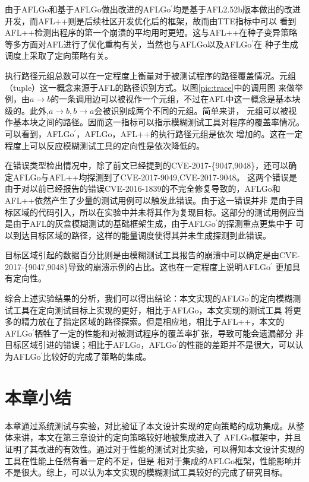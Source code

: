 \documentclass[bachelor]{njupthesis}
\begin{document}
由于AFLGo和基于AFLGo做出改进的AFLGo$^\prime$均是基于AFL2.52b版本做出的改进开发，而AFL++则是后续社区开发优化后的框架，故而由TTE指标中可以
看到AFL++检测出程序的第一个崩溃的平均用时更短。这与AFL++在种子变异策略等多方面对AFL进行了优化重构有关，当然也与AFLGo以及AFLGo$^\prime$在
种子生成调度上采取了定向策略有关。

执行路径元组总数可以在一定程度上衡量对于被测试程序的路径覆盖情况。元组（tuple）这一概念来源于AFL的路径识别方式。以图\ref{pic:trace}中的调用图
来做举例，由$a\to b$的一条调用边可以被视作一个元组，不过在AFL中这一概念是基本块级的。此外,$a \to b , b \to a$会被识别成两个不同的元组。简单来讲，
元组可以被视作基本块之间的路径。因而这一指标可以指示模糊测试工具对程序的覆盖率情况。可以看到，AFLGo$^\prime$，AFLGo，AFL++的执行路径元组是依次
增加的。这在一定程度上可以反应模糊测试工具的定向性是依次降低的。

在错误类型检出情况中，除了前文已经提到的CVE-2017-\{9047,9048\}，还可以确定AFLGo与AFL++均探测到了CVE-2017-9049\cite{49CVE},CVE-2017-9048\cite{50CVE}。
这两个错误是由于对以前已经报告的错误CVE-2016-1839\cite{39CVE}的不完全修复导致的，AFLGo和AFL++依然产生了少量的测试用例可以触发此错误。由于这一错误并非
是由于目标区域的代码引入，所以在实验中并未将其作为复现目标。这部分的测试用例应当是由于AFL的灰盒模糊测试的基础框架生成，由于AFLGo$^\prime$的探测重点更集中于
可以到达目标区域的路径，这样的能量调度使得其并未生成探测到此错误。

目标区域引起的数据百分比则是由模糊测试工具报告的崩溃中可以确定是由CVE-2017-\{9047,9048\}导致的崩溃示例的占比。这也在一定程度上说明AFLGo$^\prime$
更加具有定向性。

综合上述实验结果的分析，我们可以得出结论：本文实现的AFLGo$^\prime$的定向模糊测试工具在定向测试目标上实现的更好，相比于AFLGo，本文实现的测试工具
将更多的精力放在了指定区域的路径探索。但是相应地，相比于AFL++，本文的AFLGo$^\prime$牺牲了一定的性能和对被测试程序的覆盖率扩张，导致可能会遗漏部分
非目标区域引进的错误；相比于AFLGo，AFLGo$^\prime$的性能的差距并不是很大，可以认为AFLGo$^\prime$比较好的完成了策略的集成。
\section{本章小结}
本章通过系统测试与实验，对比验证了本文设计实现的定向策略的成功集成。从整体来讲，本文在第三章设计的定向策略较好地被集成进入了
AFLGo框架中，并且证明了其改进的有效性。通过对于性能的测试对比实验，可以得知本文设计实现的工具在性能上任然有着一定的不足，但是
相对于集成的AFLGo框架，性能影响并不是很大。综上，可以认为本文实现的模糊测试工具较好的完成了研究目标。
\end{document}
